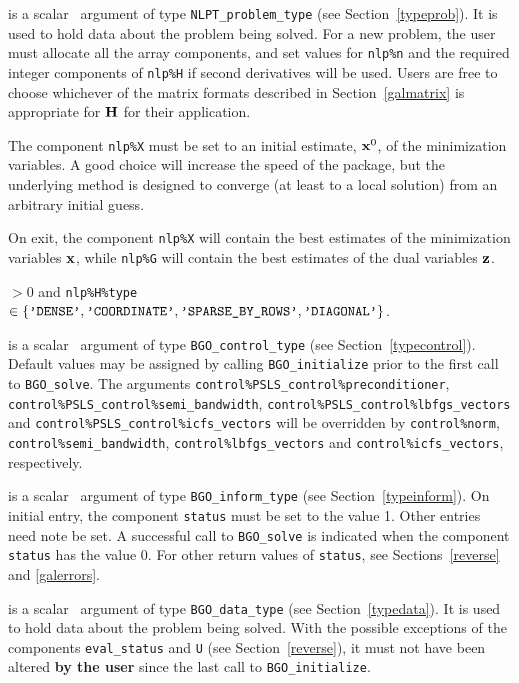 \documentclass{galahad}
\newcommand{\packagename}{BGO}
\begin{document}
\vspace*{-2mm}
\begin{description}
 is a scalar \intentinout\ argument of type
{\tt NLPT\_problem\_type}
(see Section~\ref{typeprob}).
It is used to hold data about the problem being solved.
For a new problem, the user must allocate all the array components,
and set values for {\tt nlp\%n}
and the required integer components of {\tt nlp\%H} if second derivatives
will be used.
Users are free to choose whichever
of the matrix formats described in Section~\ref{galmatrix}
is appropriate for ${\mathbf{H}}$ for their application.

\noindent
The component {\tt nlp\%X} must be set to an initial estimate, ${\mathbf{x}}^{0}$,
of the minimization variables. A good choice will increase the speed
of the package, but the underlying method is designed to converge (at least
to a local solution) from an arbitrary initial guess.

\noindent
On exit, the component {\tt nlp\%X} will contain the best estimates of the
minimization variables ${\mathbf{x}}$, while {\tt nlp\%G} will contain the best 
estimates of the dual variables ${\mathbf{z}}$.

\noindent
{} $> 0$ and
{\tt nlp\%H\%type} $\in \{
  \mbox{\tt 'DENSE'}, \mbox{\tt 'COORDINATE'}, \mbox{\tt 'SPARSE\_BY\_ROWS'},
  \mbox{\tt 'DIAGONAL'} \}$.

 is a scalar \intentin\ argument of type
{\tt \packagename\_control\_type}
(see Section~\ref{typecontrol}). Default values may be assigned by calling
{\tt \packagename\_initialize} prior to the first call to
{\tt \packagename\_solve}. The arguments
{\tt control\%PSLS\_control\-\%preconditioner},
{\tt control\%PSLS\_control\%semi\_bandwidth},
{\tt control\%PSLS\_control\%lbfgs\_vectors} and
{\tt control\%PSLS\_control\%icfs\_vectors}
will be overridden by
{\tt control\%norm},
{\tt control\%semi\_bandwidth},
{\tt control\%lbfgs\_vectors} and
{\tt control\%icfs\_vectors}, respectively.

 is a scalar \intentinout\ argument of type
{\tt \packagename\_inform\_type}
(see Section~\ref{typeinform}).
On initial entry, the  component {\tt status} must be set to the value 1.
Other entries need note be set.
A successful call to
{\tt \packagename\_solve}
is indicated when the  component {\tt status} has the value 0.
For other return values of {\tt status}, see Sections~\ref{reverse} and
\ref{galerrors}.

 is a scalar \intentinout\ argument of type
{\tt \packagename\_data\_type}
(see Section~\ref{typedata}). It is used to hold data about the problem being
solved. With the possible exceptions of the components
{\tt eval\_status} and {\tt U} (see Section~\ref{reverse}),
it must not have been altered {\bf by the user} since the last call to
{\tt \packagename\_initialize}.


\end{description}
\end{document}
